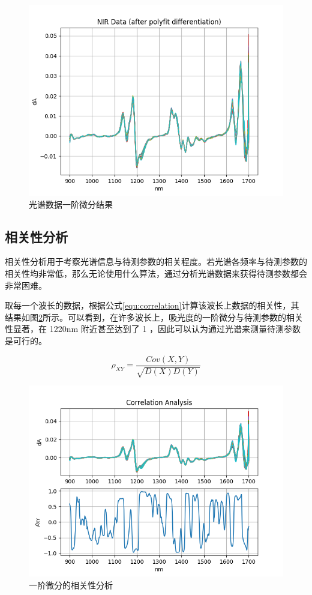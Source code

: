 \documentclass[a4paper, 12pt]{article}
\begin{document}
			\begin{figure}
				\centering
				\includegraphics[width=0.8\linewidth]{../img/diff}
				\caption{光谱数据一阶微分结果}
				\label{fig:diff}
			\end{figure}
			
		\subsection{相关性分析}
			相关性分析用于考察光谱信息与待测参数的相关程度。若光谱各频率与待测参数的相关性均非常低，那么无论使用什么算法，通过分析光谱数据来获得待测参数都会非常困难。
			
			取每一个波长的数据，根据公式\eqref{equ:correlation}计算该波长上数据的相关性，其结果如图\ref{fig:correlation}所示。可以看到，在许多波长上，吸光度的一阶微分与待测参数的相关性显著，在 1220nm 附近甚至达到了 1 ，因此可以认为通过光谱来测量待测参数是可行的。
			
			\begin{equation}\label{equ:correlation}
				\rho_{XY} = \frac{Cov(X, Y)}{\sqrt{D(X)D(Y)}}
			\end{equation}
			\begin{figure}
				\centering
				\includegraphics[width=0.8\linewidth]{../img/correlation}
				\caption{一阶微分的相关性分析}
				\label{fig:correlation}
			\end{figure}
			
\end{document}
